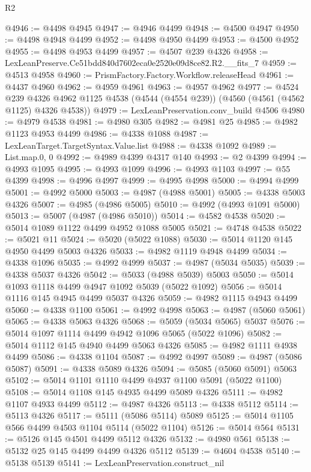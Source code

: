 \begin{lexlean}{R2}
\begin{coremodule}
@4946 := @4498 @4945
@4947 := @4946 @4499
@4948 := @4500 @4947
@4950 := @4498 @4948 @4499
@4952 := @4498 @4950 @4499
@4953 := @4500 @4952
@4955 := @4498 @4953 @4499
@4957 := @4507 @239 @4326
@4958 := LexLeanPreserve.Ce51bdd840d7602eca0e2520e09d8ce82.R2.__fits_7
@4959 := @4513 @4958
@4960 := PrismFactory.Factory.Workflow.releaseHead
@4961 := @4437 @4960
@4962 := @4959 @4961
@4963 := @4957 @4962
@4977 := @4524
    @239
    @4326
    @4962
    @1125
    @4538
    (@4544 (@4554 @239))
    (@4560 (@4561 (@4562 @1125) @4326 @4538))
@4979 := LexLeanPreservation.conv_build @4506
@4980 := @4979 @4538
@4981 := @4980 @305
@4982 := @4981 @25
@4985 := @4982 @1123 @4953 @4499
@4986 := @4338 @1088
@4987 := LexLeanTarget.TargetSyntax.Value.list
@4988 := @4338 @1092
@4989 := List.map.{0, 0}
@4992 := @4989 @4399 @4317 @140
@4993 := @2 @4399
@4994 := @4993 @1095
@4995 := @4993 @1099
@4996 := @4993 @1103
@4997 := @55 @4399
@4998 := @4996 @4997
@4999 := @4995 @4998
@5000 := @4994 @4999
@5001 := @4992 @5000
@5003 := @4987 (@4988 @5001)
@5005 := @4338 @5003 @4326
@5007 := @4985 (@4986 @5005)
@5010 := @4992 (@4993 @1091 @5000)
@5013 := @5007 (@4987 (@4986 @5010))
@5014 := @4582 @4538
@5020 := @5014 @1089 @1122 @4499 @4952 @1088 @5005
@5021 := @4748 @4538
@5022 := @5021 @11
@5024 := @5020 (@5022 @1088)
@5030 := @5014 @1120 @145 @4950 @4499 @5003 @4326
@5033 := @4982 @1119 @4948 @4499
@5034 := @4338 @1096
@5035 := @4992 @4999
@5037 := @4987 (@5034 @5035)
@5039 := @4338 @5037 @4326
@5042 := @5033 (@4988 @5039) @5003
@5050 := @5014 @1093 @1118 @4499 @4947 @1092 @5039 (@5022 @1092)
@5056 := @5014 @1116 @145 @4945 @4499 @5037 @4326
@5059 := @4982 @1115 @4943 @4499
@5060 := @4338 @1100
@5061 := @4992 @4998
@5063 := @4987 (@5060 @5061)
@5065 := @4338 @5063 @4326
@5068 := @5059 (@5034 @5065) @5037
@5076 := @5014 @1097 @1114 @4499 @4942 @1096 @5065 (@5022 @1096)
@5082 := @5014 @1112 @145 @4940 @4499 @5063 @4326
@5085 := @4982 @1111 @4938 @4499
@5086 := @4338 @1104
@5087 := @4992 @4997
@5089 := @4987 (@5086 @5087)
@5091 := @4338 @5089 @4326
@5094 := @5085 (@5060 @5091) @5063
@5102 := @5014 @1101 @1110 @4499 @4937 @1100 @5091 (@5022 @1100)
@5108 := @5014 @1108 @145 @4935 @4499 @5089 @4326
@5111 := @4982 @1107 @4933 @4499
@5112 := @4987 @4326
@5113 := @4338 @5112
@5114 := @5113 @4326
@5117 := @5111 (@5086 @5114) @5089
@5125 := @5014 @1105 @566 @4499 @4503 @1104 @5114 (@5022 @1104)
@5126 := @5014 @564
@5131 := @5126 @145 @4501 @4499 @5112 @4326
@5132 := @4980 @561
@5138 := @5132 @25 @145 @4499 @4499 @4326 @5112
@5139 := @4604 @4538
@5140 := @5138 @5139
@5141 := LexLeanPreservation.construct_nil

\end{coremodule}
\end{lexlean}
